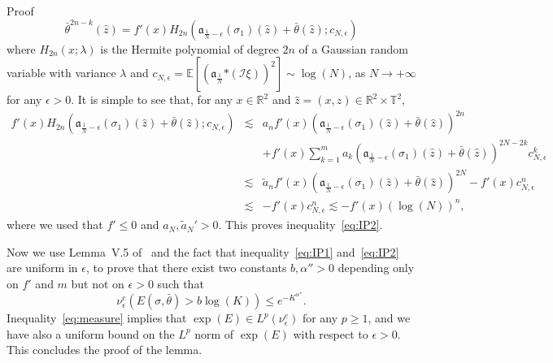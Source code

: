\documentclass[a4paper,10pt]{article}
\newcommand{\asterisk}{\mathord{*}}
\newenvironment{proof*}[1]{\noindent\textbf{#1\ }}{\hspace*{\fill}$\Box$\medskip}
\begin{document}
\begin{proof*}{Proof}
\[     \bar{\theta}^{2 n - k} (\hat{z}) = f' (x) H_{2 n} \left(
     \mathfrak{a}_{\frac{1}{N} - \epsilon} (\sigma_1) (\hat{z}) + \bar{\theta}
     (\hat{z}) ; c_{N, \epsilon} \right) \]
  where $H_{2 n} (x ; \lambda)$ is the Hermite polynomial of degree $2 n$ of a
  Gaussian random variable with variance $\lambda$ and $c_{N, \epsilon}
  =\mathbb{E} \left[ \left( \mathfrak{a}_{\frac{1}{N}} \asterisk (\mathcal{I}
  \xi) \right)^2 \right] \sim \log (N)$, as $N \rightarrow + \infty$ for any
  $\epsilon > 0$. It is simple to see that, for any $x \in \mathbb{R}^2$ and
  $\hat{z} = (x, z) \in \mathbb{R}^2 \times \mathbb{T}^2$,
  \begin{eqnarray}
    f' (x) H_{2 n} \left( \mathfrak{a}_{\frac{1}{N} - \epsilon} (\sigma_1)
    (\hat{z}) + \bar{\theta} (\hat{z}) ; c_{N, \epsilon} \right) & \lesssim &
    a_n f' (x) \left( \mathfrak{a}_{\frac{1}{N} - \epsilon} (\sigma_1)
    (\hat{z}) + \bar{\theta} (\hat{z}) \right)^{2 n} \nonumber\\
    &  & + f' (x) \sum_{k = 1}^m a_k \left( \mathfrak{a}_{\frac{1}{N} -
    \epsilon} (\sigma_1) (\hat{z}) + \bar{\theta} (\hat{z}) \right)^{2 N - 2
    k} c_{N, \epsilon}^k \nonumber\\
    & \lesssim & \tilde{a}_n f' (x) \left( \mathfrak{a}_{\frac{1}{N} -
    \epsilon} (\sigma_1) (\hat{z}) + \bar{\theta} (\hat{z}) \right)^{2 N} - f'
    (x) c_{N, \epsilon}^n \nonumber\\
    & \lesssim & - f' (x) c_{N, \epsilon}^n \lesssim - f' (x) (\log (N))^n,
    \nonumber
  \end{eqnarray}
  where we used that $f' \leqslant 0$ and $a_N, \tilde{a}_N' > 0$. This proves
  inequality~{\eqref{eq:IP2}}.
  
  Now we use Lemma~V.5 of~{\cite{Simon1974}} and the fact that
  inequality~{\eqref{eq:IP1}} and~{\eqref{eq:IP2}} are uniform in $\epsilon$,
  to prove that there exist two constants $b, \alpha'' > 0$ depending only on
  $f'$ and $m$ but not on $\epsilon > 0$ such that
  \begin{equation}
    \nu_{\epsilon}^e (E (\sigma, \bar{\theta}) > b \log (K)) \leqslant e^{-
    K^{\alpha''}} . \label{eq:measure}
  \end{equation}
  Inequality~{\eqref{eq:measure}} implies that $\exp (E) \in L^p
  (\nu^e_{\epsilon})$ for any $p \geq 1$, and we have also a uniform bound on
  the $L^p$ norm of $\exp (E)$ with respect to $\epsilon > 0$. This concludes
  the proof of the lemma.
\end{proof*}
\end{document}
